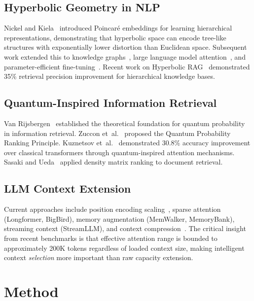 \documentclass[11pt,a4paper]{article}
\begin{document}
\subsection{Hyperbolic Geometry in NLP}

Nickel and Kiela~\cite{nickel2017poincare} introduced Poincar\'{e}
embeddings for learning hierarchical representations, demonstrating that
hyperbolic space can encode tree-like structures with exponentially lower
distortion than Euclidean space.  Subsequent work extended this to knowledge
graphs~\cite{sun2024lorentz}, large language model
attention~\cite{patil2025hyperbolicllm}, and parameter-efficient
fine-tuning~\cite{bronstein2024hyplora}.  Recent work on Hyperbolic
RAG~\cite{chen2025hyperbolicrag} demonstrated 35\% retrieval precision
improvement for hierarchical knowledge bases.

\subsection{Quantum-Inspired Information Retrieval}

Van Rijsbergen~\cite{vanrijsbergen2004} established the theoretical
foundation for quantum probability in information retrieval.  Zuccon
et~al.~\cite{zuccon2009} proposed the Quantum Probability Ranking Principle.
Kuznetsov et~al.~\cite{kuznetsov2026qisa} demonstrated 30.8\% accuracy
improvement over classical transformers through quantum-inspired attention
mechanisms.  Sasaki and Ueda~\cite{sasaki2023quantumctx} applied density
matrix ranking to document retrieval.

\subsection{LLM Context Extension}

Current approaches include position encoding
scaling~\cite{peng2024yarn}, sparse attention (Longformer, BigBird), memory
augmentation (MemWalker, MemoryBank), streaming context (StreamLLM), and
context
compression~\cite{jiang2024longllmlingua,li2026ata,su2025enhancingrag}.
The critical insight from recent benchmarks is that effective attention range
is bounded to approximately 200K tokens regardless of loaded context size,
making intelligent context \emph{selection} more important than raw capacity
extension.


\section{Method}
\label{sec:method}
\end{document}
